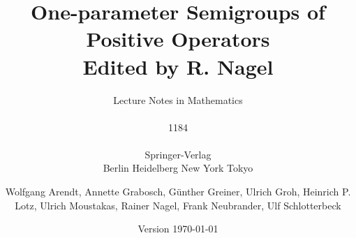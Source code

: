 \documentclass[%
	,graybox
	,envcountsect			%
	]{svmono}
\date{\LARGE Version \today}
\begin{document}
\author{Wolfgang Arendt, Annette Grabosch, Günther Greiner, Ulrich Groh, Heinrich P. Lotz, Ulrich Moustakas, Rainer Nagel, Frank Neubrander, Ulf Schlotterbeck}
\title{One-parameter Semigroups of Positive Operators\\
		{\large{Edited by R. Nagel}}}
\subtitle{Lecture Notes in Mathematics\\ \\ 1184\\ \\Springer-Verlag\\ Berlin Heidelberg New York Tokyo}
\maketitle
\frontmatter%

%

%
\tableofcontents
% 
%
\mainmatter%
%

 




% 






%






%






%

%
%
%
%
%
%
%



\backmatter%

\RaggedRight

 

%

%

\cleardoublepage 
\printindex





\end{document}
